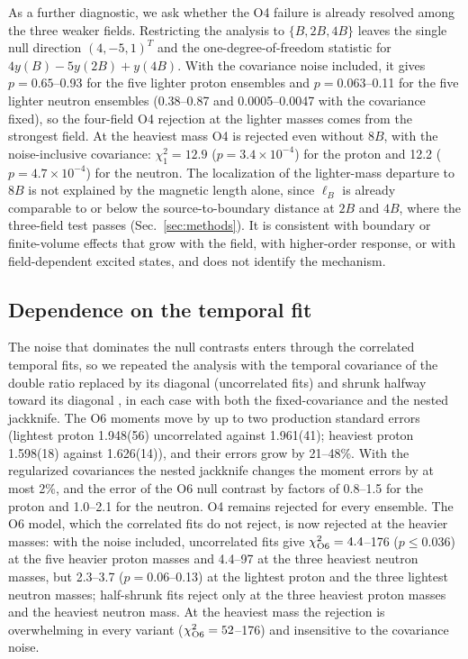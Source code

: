 \documentclass[aps,prd,preprint,nofootinbib,floatfix]{revtex4-2}
\begin{document}
As a further diagnostic, we ask whether the O4 failure is already resolved among the three weaker fields. Restricting the analysis to $\{B,2B,4B\}$ leaves the single null direction $(4,-5,1)^T$ and the one-degree-of-freedom statistic for $4y(B)-5y(2B)+y(4B)$. With the covariance noise included, it gives $p=0.65$--0.93 for the five lighter proton ensembles and $p=0.063$--0.11 for the five lighter neutron ensembles (0.38--0.87 and 0.0005--0.0047 with the covariance fixed), so the four-field O4 rejection at the lighter masses comes from the strongest field. At the heaviest mass O4 is rejected even without $8B$, with the noise-inclusive covariance: $\chi^2_1=12.9$ ($p=3.4\times10^{-4}$) for the proton and 12.2 ($p=4.7\times10^{-4}$) for the neutron. The localization of the lighter-mass departure to $8B$ is not explained by the magnetic length alone, since $\ell_B$ is already comparable to or below the source-to-boundary distance at $2B$ and $4B$, where the three-field test passes (Sec.~\ref{sec:methods}). It is consistent with boundary or finite-volume effects that grow with the field, with higher-order response, or with field-dependent excited states, and does not identify the mechanism.

\subsection{Dependence on the temporal fit}
\label{sec:tempreg}

The noise that dominates the null contrasts enters through the correlated temporal fits, so we repeated the analysis with the temporal covariance of the double ratio replaced by its diagonal (uncorrelated fits) and shrunk halfway toward its diagonal \cite{Michael1994,MichaelMcKerrell1995,LedoitWolf2004}, in each case with both the fixed-covariance and the nested jackknife. The O6 moments move by up to two production standard errors (lightest proton 1.948(56) uncorrelated against 1.961(41); heaviest proton 1.598(18) against 1.626(14)), and their errors grow by 21--48\%. With the regularized covariances the nested jackknife changes the moment errors by at most 2\%, and the error of the O6 null contrast by factors of 0.8--1.5 for the proton and 1.0--2.1 for the neutron. O4 remains rejected for every ensemble. The O6 model, which the correlated fits do not reject, is now rejected at the heavier masses: with the noise included, uncorrelated fits give $\chi^2_{\rm O6}=4.4$--176 ($p\le0.036$) at the five heavier proton masses and 4.4--97 at the three heaviest neutron masses, but 2.3--3.7 ($p=0.06$--0.13) at the lightest proton and the three lightest neutron masses; half-shrunk fits reject only at the three heaviest proton masses and the heaviest neutron mass. At the heaviest mass the rejection is overwhelming in every variant ($\chi^2_{\rm O6}=52$--176) and insensitive to the covariance noise.
\end{document}
